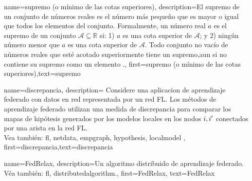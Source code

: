 {name=supremo (o mínimo de las cotas superiores),
	description={El supremo de un conjunto de números reales es 
		el número más pequeño que es mayor o igual que todos los elementos del conjunto. Formalmente, un número real 
		$a$ es el supremo de un conjunto $\mathcal{A} \subseteq \mathbb{R}$ si: 1) $a$ 
		es una cota superior de $\mathcal{A}$; y 2) ningún número menor que $a$ es una cota superior de $\mathcal{A}$. 
		Todo conjunto no vacío de números reales que esté acotado superiormente tiene un supremo,aun si no contiene su supremo como un elemento \cite[Sec.~1.4]{RudinBookPrinciplesMatheAnalysis}.},
	first={supremo (o mínimo de las cotas superiores)},text={supremo}
}

{name=discrepancia,
	description={
		Considere una aplicacion de aprendizaje federado con datos en red 
		representada por un red FL. Los métodos de aprendizaje federado utilizan una medida de discrepancia para  
		comparar los mapas de hipótesis generados por los modelos locales en los nodos $i,i'$ 
		conectados por una arista en la red FL.
		\\
			Vea también: \gls{fl}, \gls{netdata}, \gls{empgraph}, \gls{hypothesis}, \gls{localmodel} },
	first={discrepancia},text={discrepancia}
}

{name={FedRelax},
	description={Un algoritmo distribuido de aprendizaje federado.\\ 
		Véa también: \gls{fl}, \gls{distributedalgorithm}.},
	first={FedRelax},
	text={FedRelax}
} 

